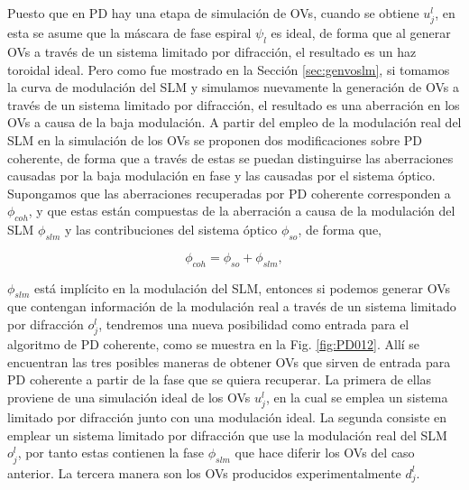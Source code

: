 Puesto que en PD hay una etapa de simulación de OVs, cuando se obtiene $u_j^l$, en esta se asume que la máscara de fase espiral $\psi_l$ es ideal, de forma que al generar OVs a través de un sistema limitado por difracción, el resultado es un haz toroidal ideal. Pero como fue mostrado en la Sección \ref{sec:genvoslm}, si tomamos la curva de modulación del SLM y simulamos nuevamente la generación de OVs a través de un sistema limitado por difracción, el resultado es una aberración en los OVs a causa de la baja modulación. A partir del empleo de la modulación real del SLM en la simulación de los OVs se proponen dos modificaciones sobre PD coherente, de forma que a través de estas se puedan distinguirse las aberraciones causadas por la baja modulación en fase y las causadas por el sistema óptico. \\

Supongamos que las aberraciones recuperadas por PD coherente corresponden a $\phi_{coh}$, y que estas están compuestas de la aberración a causa de la modulación del SLM $\phi_{slm}$ y las contribuciones del sistema óptico $\phi_{so}$, de forma que,

\begin{equation}
\label{eqPDs}
\phi_{coh} = \phi_{so} + \phi_{slm},
\end{equation}

$\phi_{slm}$ está implícito en la modulación del SLM, entonces si podemos generar OVs que contengan información de la modulación real a través de un sistema limitado por difracción $o_j^l$, tendremos una nueva posibilidad como entrada para el algoritmo de PD coherente, como se muestra en la Fig. \ref{fig:PD012}. Allí se encuentran las tres posibles maneras de obtener OVs que sirven de entrada para PD coherente a partir de la fase que se quiera recuperar. La primera de ellas proviene de una simulación ideal de los OVs  $u_j^l$, en la cual se emplea un sistema limitado por difracción junto con una modulación ideal. La segunda consiste en emplear un sistema limitado por difracción que use la modulación real del SLM $o_j^l$, por tanto estas contienen la fase $\phi_{slm}$ que hace diferir los OVs del caso anterior. La tercera manera son los OVs producidos experimentalmente $d_j^l$.\\

